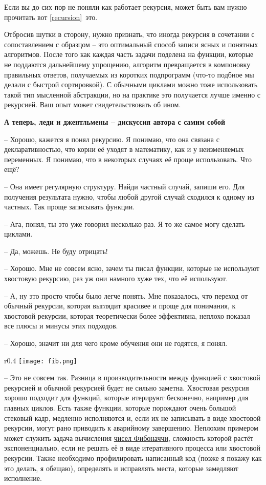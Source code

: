 Если вы до сих пор не поняли как работает рекурсия, может быть вам нужно прочитать вот \ref{recursion}~это.

Отбросив шутки в сторону, нужно признать, что иногда рекурсия в сочетании с сопоставлением с образцом \--- это оптимальный способ записи ясных и понятных алгоритмов.
После того как каждая часть задачи поделена на функции, которые не поддаются дальнейшему упрощению, алгоритм превращается в компоновку правильных ответов, получаемых из коротких подпрограмм (что\--то подбное мы делали с быстрой сортировкой).
С обычными циклами можно тоже использовать такой тип мысленной абстракции, но на практике это получается лучше именно с рекурсией.
Ваш опыт может свидетельствовать об ином.

\textbf{А теперь, леди и джентльмены \--- дискуссия автора с самим собой}

\--- Хорошо, кажется я понял рекурсию.
Я понимаю, что она связана с декларативностью, что корни её уходят в математику, как и у неизменяемых переменных. Я понимаю, что в некоторых случаях её проще использовать. Что ещё?

\--- Она имеет регулярную структуру.
Найди частный случай, запиши его.
Для получения результата нужно, чтобы любой другой случай сходился к одному из частных.
Так проще записывать функции.

\--- Ага, понял, ты это уже говорил несколько раз.
Я то же самое могу сделать циклами.

\--- Да, можешь.
Не буду отрицать!

\--- Хорошо.
Мне не совсем ясно, зачем ты писал функции, которые не используют хвостовую рекурсию, раз уж они намного хуже тех, что её используют.

\--- А, ну это просто чтобы было легче понять.
Мне показалось, что переход от обычный рекурсии, которая выглядит красивее и проще для понимания, к хвостовой рекурсии, которая теоретически более эффективна, неплохо показал все плюсы и минусы этих подходов.

\--- Хорошо, значит ни для чего кроме обучения они не годятся, я понял.
\begin{wrapfigure}{r}{0.4\linewidth}
    \texttt{[image: fib.png]}
\end{wrapfigure}

\--- Это не совсем так.
Разница в производительности между функцией с хвостовой рекурсией и обычной рекурсией будет не сильно заметна.
Хвостовая рекурсия хорошо подходит для функций, которые итерируют бесконечно, например для главных циклов.
Есть также функции, которые порождают очень большой стековый кадр, медленно исполняются и, если их не записывать в виде хвостовой рекурсии, могут рано приводить к аварийному завершению.
Неплохим примером может служить задача вычисления \href{http://en.wikipedia.org/wiki/Fibonacci\_number}{чисел Фибоначчи}, сложность которой растёт экспоненциально, если не решать её в виде итеративного процесса или хвостовой рекурсии.
Также необходимо профилировать написанный код (позже я покажу как это делать, я обещаю), определять и исправлять места, которые замедляют исполнение.

